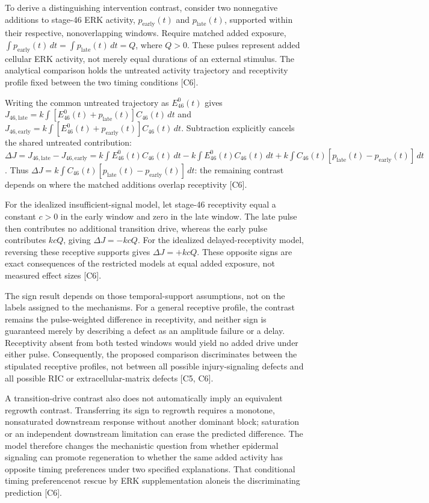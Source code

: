 \documentclass[11pt]{article}
\begin{document}
To derive a distinguishing intervention contrast, consider two nonnegative additions to stage-46 ERK activity, $p_{\mathrm{early}}(t)$ and $p_{\mathrm{late}}(t)$, supported within their respective, nonoverlapping windows. Require matched added exposure, $\int p_{\mathrm{early}}(t)\,dt=\int p_{\mathrm{late}}(t)\,dt=Q$, where $Q>0$. These pulses represent added cellular ERK activity, not merely equal durations of an external stimulus. The analytical comparison holds the untreated activity trajectory and receptivity profile fixed between the two timing conditions [C6].

Writing the common untreated trajectory as $E_{46}^{0}(t)$ gives $J_{46,\mathrm{late}}=k\int [E_{46}^{0}(t)+p_{\mathrm{late}}(t)]C_{46}(t)\,dt$ and $J_{46,\mathrm{early}}=k\int [E_{46}^{0}(t)+p_{\mathrm{early}}(t)]C_{46}(t)\,dt$. Subtraction explicitly cancels the shared untreated contribution: $\Delta J=J_{46,\mathrm{late}}-J_{46,\mathrm{early}}=k\int E_{46}^{0}(t)C_{46}(t)\,dt-k\int E_{46}^{0}(t)C_{46}(t)\,dt+k\int C_{46}(t)[p_{\mathrm{late}}(t)-p_{\mathrm{early}}(t)]\,dt$. Thus $\Delta J=k\int C_{46}(t)[p_{\mathrm{late}}(t)-p_{\mathrm{early}}(t)]\,dt$: the remaining contrast depends on where the matched additions overlap receptivity [C6].

For the idealized insufficient-signal model, let stage-46 receptivity equal a constant $c>0$ in the early window and zero in the late window. The late pulse then contributes no additional transition drive, whereas the early pulse contributes $kcQ$, giving $\Delta J=-kcQ$. For the idealized delayed-receptivity model, reversing these receptive supports gives $\Delta J=+kcQ$. These opposite signs are exact consequences of the restricted models at equal added exposure, not measured effect sizes [C6].

The sign result depends on those temporal-support assumptions, not on the labels assigned to the mechanisms. For a general receptive profile, the contrast remains the pulse-weighted difference in receptivity, and neither sign is guaranteed merely by describing a defect as an amplitude failure or a delay. Receptivity absent from both tested windows would yield no added drive under either pulse. Consequently, the proposed comparison discriminates between the stipulated receptive profiles, not between all possible injury-signaling defects and all possible RIC or extracellular-matrix defects [C5, C6].

A transition-drive contrast also does not automatically imply an equivalent regrowth contrast. Transferring its sign to regrowth requires a monotone, nonsaturated downstream response without another dominant block; saturation or an independent downstream limitation can erase the predicted difference. The model therefore changes the mechanistic question from whether epidermal signaling can promote regeneration to whether the same added activity has opposite timing preferences under two specified explanations. That conditional timing preference\textemdash{}not rescue by ERK supplementation alone\textemdash{}is the discriminating prediction [C6].
\end{document}
